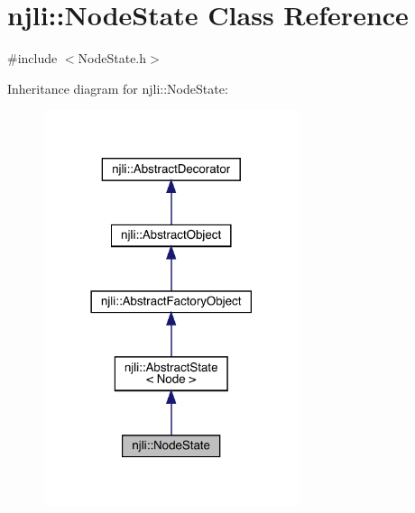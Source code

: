 \hypertarget{classnjli_1_1_node_state}{}\section{njli\+:\+:Node\+State Class Reference}
\label{classnjli_1_1_node_state}


{\ttfamily \#include $<$Node\+State.\+h$>$}



Inheritance diagram for njli\+:\+:Node\+State\+:\nopagebreak
\begin{figure}[H]
\begin{center}
\leavevmode
\includegraphics[width=213pt]{classnjli_1_1_node_state__inherit__graph}
\end{center}
\end{figure}



